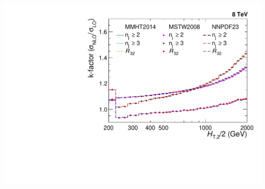 \documentclass{beamer}
\begin{document}
\begin{frame}
\hspace{25mm}\includegraphics[scale = 0.24]{Plots_HT_2_150/Kfactor_all_2.pdf}\\
\end{frame}
\end{document}
